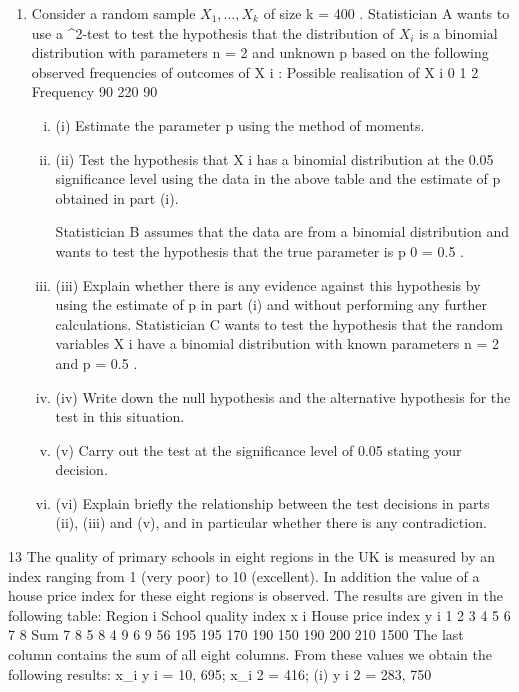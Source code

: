 \documentclass[a4paper,12pt]{article}
\begin{document}
\begin{enumerate}

\item Consider a random sample $X_1 , ... , X_k$ of size k = 400 . Statistician A wants to use a
\chi^2-test to test the hypothesis that the distribution of $X_i$ is a binomial distribution
with parameters n = 2 and unknown p based on the following observed frequencies
of outcomes of X i :
Possible realisation of X i 0 1 2
Frequency 90 220 90
\begin{enumerate}[(i)]
\item (i) Estimate the parameter p using the method of moments.
\item (ii) Test the hypothesis that X i has a binomial distribution at the 0.05 significance
level using the data in the above table and the estimate of p obtained in
part (i).

Statistician B assumes that the data are from a binomial distribution and wants to test
the hypothesis that the true parameter is p 0 = 0.5 .
\item (iii)
Explain whether there is any evidence against this hypothesis by using the
estimate of p in part (i) and without performing any further calculations. 
Statistician C wants to test the hypothesis that the random variables X i have a
binomial distribution with known parameters n = 2 and p = 0.5 .
\item (iv) Write down the null hypothesis and the alternative hypothesis for the test in
this situation.

\item (v) Carry out the test at the significance level of 0.05 stating your decision.
\item (vi) Explain briefly the relationship between the test decisions in parts (ii), (iii) and
(v), and in particular whether there is any contradiction.
\end{enumerate}
\end{enumerate}


\newpage

13
The quality of primary schools in eight regions in the UK is measured by an index
ranging from 1 (very poor) to 10 (excellent). In addition the value of a house price
index for these eight regions is observed. The results are given in the following table:
Region i
School quality index x i
House price index y i
1
2
3
4
5
6
7
8
Sum
7
8
5
8
4
9
6
9
56
195 195 170 190 150 190 200 210 1500
The last column contains the sum of all eight columns.
From these values we obtain the following results:
\sum x_i y i = 10, 695; \sum x_i 2 = 416;
(i)
\sum y i 2 = 283, 750
\end{document}
